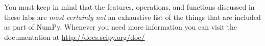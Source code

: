 You must keep in mind that the features, operations, and functions discussed in these labs are \emph{most certainly not} an exhaustive list of the things that are included as part of NumPy.
Whenever you need more information you can visit the documentation at \url{http://docs.scipy.org/doc/}

